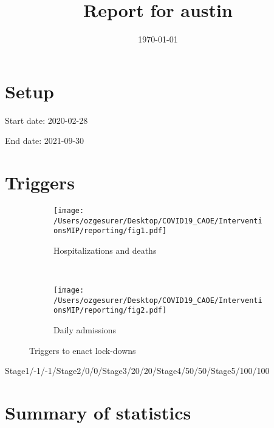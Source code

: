 \documentclass{article}
\title{Report for austin}
\author{}
\date{\today}
\begin{document}
\maketitle

\section*{Setup}

Start date: 2020-02-28

End date: 2021-09-30 




\section*{Triggers}
\begin{figure}[!htb]
  \centering
  \setlength{\unitlength}{1cm}
    \begin{subfigure}[b]{0.475\linewidth}
    \centering
        \texttt{[image: /Users/ozgesurer/Desktop/COVID19\_CAOE/InterventionsMIP/reporting/fig1.pdf]}
        \caption{Hospitalizations  and deaths}
        \label{fig:IHD}
    \end{subfigure}
    ~
    \begin{subfigure}[b]{0.475\linewidth}
    \centering
         \texttt{[image: /Users/ozgesurer/Desktop/COVID19\_CAOE/InterventionsMIP/reporting/fig2.pdf]}
        \caption{Daily admissions}
        \label{fig:IYIH}
    \end{subfigure}
    \caption{Triggers to enact lock-downs}\label{fig:SD90}
\end{figure}

Stage1/-1/-1/Stage2/0/0/Stage3/20/20/Stage4/50/50/Stage5/100/100

\newpage

\section*{Summary of statistics}
\end{document}
